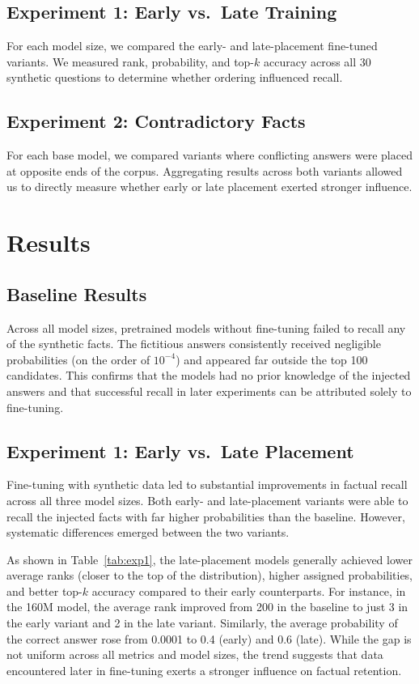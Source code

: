 \documentclass[11pt]{article}
\begin{document}
\subsection{Experiment 1: Early vs.\ Late Training}
For each model size, we compared the early- and late-placement fine-tuned variants. We measured rank, probability, and top-$k$ accuracy across all 30 synthetic questions to determine whether ordering influenced recall.

\subsection{Experiment 2: Contradictory Facts}
For each base model, we compared variants where conflicting answers were placed at opposite ends of the corpus. Aggregating results across both variants allowed us to directly measure whether early or late placement exerted stronger influence.

\section{Results}

\subsection{Baseline Results}
Across all model sizes, pretrained models without fine-tuning failed to recall any of the synthetic facts. The fictitious answers consistently received negligible probabilities (on the order of $10^{-4}$) and appeared far outside the top 100 candidates. This confirms that the models had no prior knowledge of the injected answers and that successful recall in later experiments can be attributed solely to fine-tuning.

\subsection{Experiment 1: Early vs.\ Late Placement}
Fine-tuning with synthetic data led to substantial improvements in factual recall across all three model sizes. Both early- and late-placement variants were able to recall the injected facts with far higher probabilities than the baseline. However, systematic differences emerged between the two variants.

As shown in Table~\ref{tab:exp1}, the late-placement models generally achieved lower average ranks (closer to the top of the distribution), higher assigned probabilities, and better top-$k$ accuracy compared to their early counterparts. For instance, in the 160M model, the average rank improved from 200 in the baseline to just 3 in the early variant and 2 in the late variant. Similarly, the average probability of the correct answer rose from 0.0001 to 0.4 (early) and 0.6 (late). While the gap is not uniform across all metrics and model sizes, the trend suggests that data encountered later in fine-tuning exerts a stronger influence on factual retention.
\end{document}
